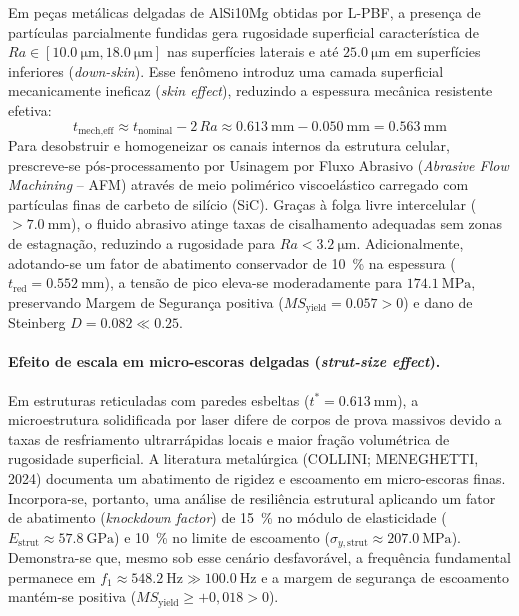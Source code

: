 Em peças metálicas delgadas de AlSi10Mg obtidas por L-PBF, a presença de partículas parcialmente fundidas gera rugosidade superficial característica de $Ra \in [\SI{10.0}{\micro\metre}, \SI{18.0}{\micro\metre}]$ nas superfícies laterais e até $\SI{25.0}{\micro\metre}$ em superfícies inferiores (\textit{down-skin}). Esse fenômeno introduz uma camada superficial mecanicamente ineficaz (\textit{skin effect}), reduzindo a espessura mecânica resistente efetiva:
\begin{equation}
  t_{\text{mech,eff}} \approx t_{\text{nominal}} - 2\,Ra \approx \SI{0.613}{\milli\metre} - \SI{0.050}{\milli\metre} = \SI{0.563}{\milli\metre}
  \label{eq:t-mech-eff}
\end{equation}
Para desobstruir e homogeneizar os canais internos da estrutura celular, prescreve-se pós-processamento por Usinagem por Fluxo Abrasivo (\textit{Abrasive Flow Machining} -- AFM) através de meio polimérico viscoelástico carregado com partículas finas de carbeto de silício (SiC). Graças à folga livre intercelular ($> \SI{7.0}{\milli\metre}$), o fluido abrasivo atinge taxas de cisalhamento adequadas sem zonas de estagnação, reduzindo a rugosidade para $Ra < \SI{3.2}{\micro\metre}$. Adicionalmente, adotando-se um fator de abatimento conservador de \SI{10}{\percent} na espessura ($t_{\text{red}} = \SI{0.552}{\milli\metre}$), a tensão de pico eleva-se moderadamente para $\SI{174.1}{\mega\pascal}$, preservando Margem de Segurança positiva ($MS_{\text{yield}} = \num{+0.057} > 0$) e dano de Steinberg $D = \num{0.082} \ll \num{0.25}$.

\paragraph*{Efeito de escala em micro-escoras delgadas (\textit{strut-size effect}).}
Em estruturas reticuladas com paredes esbeltas ($t^* = \SI{0.613}{\milli\metre}$), a microestrutura solidificada por laser difere de corpos de prova massivos devido a taxas de resfriamento ultrarrápidas locais e maior fração volumétrica de rugosidade superficial. A literatura metalúrgica (COLLINI; MENEGHETTI, 2024) documenta um abatimento de rigidez e escoamento em micro-escoras finas. Incorpora-se, portanto, uma análise de resiliência estrutural aplicando um fator de abatimento (\textit{knockdown factor}) de \SI{15}{\percent} no módulo de elasticidade ($E_{\text{strut}} \approx \SI{57.8}{\giga\pascal}$) e \SI{10}{\percent} no limite de escoamento ($\sigma_{y,\text{strut}} \approx \SI{207.0}{\mega\pascal}$). Demonstra-se que, mesmo sob esse cenário desfavorável, a frequência fundamental permanece em $f_1 \approx \SI{548.2}{\hertz} \gg \SI{100.0}{\hertz}$ e a margem de segurança de escoamento mantém-se positiva ($MS_{\text{yield}} \ge +0{,}018 > 0$).

